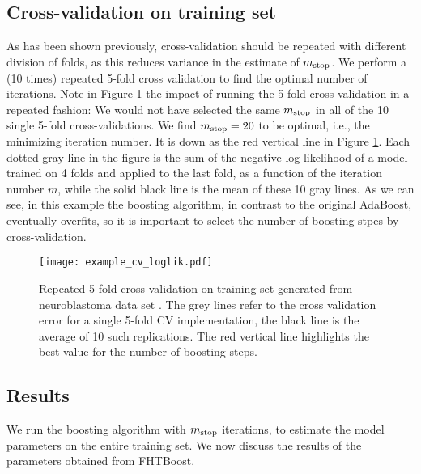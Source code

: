 \subsection{Cross-validation on training set}
As has been shown previously, cross-validation should be repeated with different division of folds, as this reduces variance in the estimate of $m_{\text{stop}}$.
We perform a (10 times) repeated 5-fold cross validation to find the optimal number of iterations.
Note in Figure \ref{fig:neuroblastoma-cv} the impact of running the 5-fold cross-validation in a repeated fashion:
We would not have selected the same $m_{\text{stop}}$ in all of the 10 single 5-fold cross-validations.
We find $m_{\text{stop}}=20$ to be optimal, i.e., the minimizing iteration number.
It is down as the red vertical line in Figure \ref{fig:neuroblastoma-cv}.
Each dotted gray line in the figure is the sum of the negative log-likelihood of a model trained on 4 folds and applied to the last fold, as a function of the iteration number $m$, while the solid black line is the mean of these 10 gray lines.
As we can see, in this example the boosting algorithm, in contrast to the original AdaBoost, eventually overfits, so it is important to select the number of boosting stpes by cross-validation.

\begin{figure}
\caption{
    Repeated 5-fold cross validation on training set generated from neuroblastoma data set \citep{oberthuer-data}.
    The grey lines refer to the cross validation error for a single 5-fold CV implementation,
    the black line is the average of 10 such replications.
    The red vertical line highlights the best value for the number of boosting steps.
}
\label{fig:neuroblastoma-cv}
\centering\texttt{[image: example\_cv\_loglik.pdf]}
\end{figure}

\subsection{Results}
We run the boosting algorithm with $m_{\text{stop}}$ iterations, to estimate the model parameters on the entire training set.
We now discuss the results of the parameters obtained from FHTBoost.

